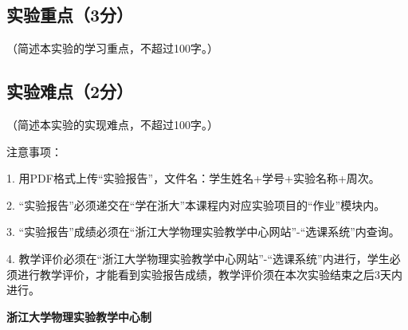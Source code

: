 \documentclass[10pt,a4paper]{ctexart} %
\begin{document}
  \subsection{实验重点（3分）}
  （简述本实验的学习重点，不超过100字。）
  
  \subsection{实验难点（2分）}
  （简述本实验的实现难点，不超过100字。）

\vspace*{\fill} %
\noindent
\begin{minipage}{\textwidth}
  注意事项：

  \begingroup
    \setlength{\leftskip}{2em} %
    1. 用PDF格式上传“实验报告”，文件名：学生姓名+学号+实验名称+周次。

    2. “实验报告”必须递交在“学在浙大”本课程内对应实验项目的“作业”模块内。

    3. “实验报告”成绩必须在“浙江大学物理实验教学中心网站”-“选课系统”内查询。

    4. 教学评价必须在“浙江大学物理实验教学中心网站”-“选课系统”内进行，学生必须进行教学评价，才能看到实验报告成绩，教学评价须在本次实验结束之后3天内进行。\par
  \endgroup

  \begin{center}
    {\bfseries 浙江大学物理实验教学中心制}
  \end{center}
\end{minipage}
\end{document}
